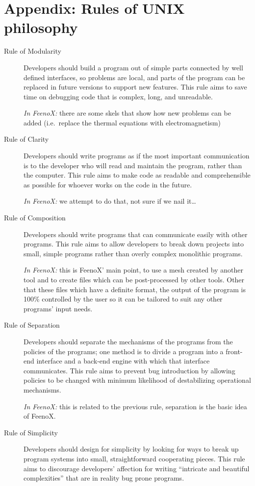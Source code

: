 \documentclass[
  american,
]{article}
\begin{document}
\hypertarget{sec:unix}{%
\section{Appendix: Rules of UNIX philosophy}\label{sec:unix}}

\begin{description}
\item[Rule of Modularity]
Developers should build a program out of simple parts connected by well
defined interfaces, so problems are local, and parts of the program can
be replaced in future versions to support new features. This rule aims
to save time on debugging code that is complex, long, and unreadable.

\emph{In FeenoX:} there are some skels that show how new problems can be
added (i.e.~replace the thermal equations with electromagnetism)
\item[Rule of Clarity]
Developers should write programs as if the most important communication
is to the developer who will read and maintain the program, rather than
the computer. This rule aims to make code as readable and comprehensible
as possible for whoever works on the code in the future.

\emph{In FeenoX:} we attempt to do that, not sure if we nail it\ldots{}
\item[Rule of Composition]
Developers should write programs that can communicate easily with other
programs. This rule aims to allow developers to break down projects into
small, simple programs rather than overly complex monolithic programs.

\emph{In FeenoX:} this is FeenoX' main point, to use a mesh created by
another tool and to create files which can be post-processed by other
tools. Other that these files which have a definite format, the output
of the program is 100\% controlled by the user so it can be tailored to
suit any other programs' input needs.
\item[Rule of Separation]
Developers should separate the mechanisms of the programs from the
policies of the programs; one method is to divide a program into a
front-end interface and a back-end engine with which that interface
communicates. This rule aims to prevent bug introduction by allowing
policies to be changed with minimum likelihood of destabilizing
operational mechanisms.

\emph{In FeenoX:} this is related to the previous rule, separation is
the basic idea of FeenoX.
\item[Rule of Simplicity]
Developers should design for simplicity by looking for ways to break up
program systems into small, straightforward cooperating pieces. This
rule aims to discourage developers' affection for writing ``intricate
and beautiful complexities'' that are in reality bug prone programs.


\end{description}
\end{document}
